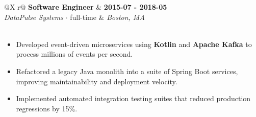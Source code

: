 \documentclass[11pt,letterpaper]{article}
\begin{document}
        \begin{infocard}
        \begin{tabularx}{\linewidth}{@{}X r@{}}
        \textbf{\large\color{headercolor} Software Engineer } & \textbf{\color{accentcolor} 2015-07 - 2018-05 } \\
        \vspace{4pt}
        \textit{\color{headercolor} DataPulse Systems } \color{accentcolor}  $\cdot$ full-time & \textit{\color{accentcolor} Boston, MA } \\
        
        
             \\
        
        \end{tabularx}

        \vspace{2pt}
        \color{textcolor}
        
            \begin{itemize}[itemsep=2pt, parsep=1pt, leftmargin=1em]
            
                \item
                
                    Developed event-driven microservices using \textbf{Kotlin} and \textbf{Apache Kafka} to process millions of events per second.
                
                
                
            
                \item
                
                    Refactored a legacy Java monolith into a suite of Spring Boot services, improving maintainability and deployment velocity.
                
                
                
            
                \item
                
                    Implemented automated integration testing suites that reduced production regressions by 15\%.
                
                
                
            
            \end{itemize}
        
        \end{infocard}
        \vspace{6pt}
    
\end{document}
